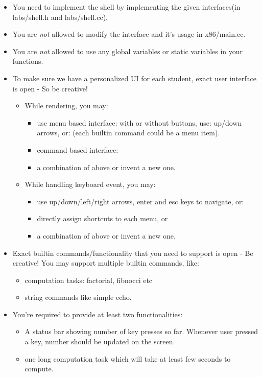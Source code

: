 \documentclass[]{article}
\providecommand{\tightlist}{%
  \setlength{\itemsep}{0pt}\setlength{\parskip}{0pt}}
\begin{document}
\begin{itemize}
\tightlist
\item
  You need to implement the shell by implementing the given
  interfaces(in labs/shell.h and labs/shell.cc).
\item
  You are \emph{not} allowed to modify the interface and it's usage in
  x86/main.cc.
\item
  You are \emph{not} allowed to use any global variables or static
  variables in your functions.
\item
  To make sure we have a personalized UI for each student, exact user
  interface is open - So be creative!

  \begin{itemize}
  \tightlist
  \item
    While rendering, you may:

    \begin{itemize}
    \tightlist
    \item
      use menu based interface: with or without buttons, use: up/down
      arrows, or: (each builtin command could be a menu item).
    \item
      command based interface:
    \item
      a combination of above or invent a new one.
    \end{itemize}
  \item
    While handling keyboard event, you may:

    \begin{itemize}
    \tightlist
    \item
      use up/down/left/right arrows, enter and esc keys to navigate, or:
    \item
      directly assign shortcuts to each menu, or
    \item
      a combination of above or invent a new one.
    \end{itemize}
  \end{itemize}
\item
  Exact builtin commands/functionality that you need to support is open
  - Be creative! You may support multiple builtin commands, like:

  \begin{itemize}
  \tightlist
  \item
    computation tasks: factorial, fibnocci etc
  \item
    string commands like simple echo.
  \end{itemize}
\item
  You're required to provide at least two functionalities:

  \begin{itemize}
  \tightlist
  \item
    A status bar showing number of key presses so far. Whenever user
    pressed a key, number should be updated on the screen.
  \item
    one long computation task which will take at least few seconds to
    compute.
  \end{itemize}
\end{itemize}
\end{document}

